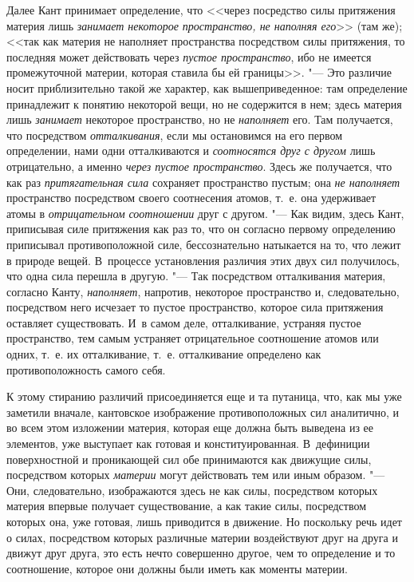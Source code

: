 Далее Кант принимает определение, что <<через посредство силы притяжения
материя лишь {\em занимает некоторое пространство, не
наполняя его}>> (там же); <<так как материя не наполняет пространства
посредством силы притяжения, то последняя может действовать через
{\em пустое пространство}, ибо не имеется промежуточной
материи, которая ставила бы ей границы>>. "--- Это различие носит
приблизительно такой же характер, как вышеприведенное: там определение
принадлежит к понятию некоторой вещи, но не содержится в нем; здесь материя
лишь {\em занимает} некоторое пространство, но не
{\em наполняет} его. Там получается, что посредством
{\em отталкивания}, если мы остановимся на его первом
определении, нами одни отталкиваются и {\em соотносятся
друг с другом} лишь отрицательно, а именно {\em через
пустое пространство}. Здесь же получается, что как раз
{\em притягательная сила} сохраняет пространство
пустым; она {\em не наполняет} пространство посредством
своего соотнесения атомов, т.~е. она удерживает атомы в {\em отрицательном}
{\em соотношении} друг с другом. "--- Как видим, здесь
Кант, приписывая силе притяжения как раз то, что он согласно первому
определению приписывал противоположной силе, бессознательно натыкается на
то, что лежит в природе вещей. В~процессе установления различия этих двух
сил получилось, что одна сила перешла в другую. "--- Так посредством
отталкивания материя, согласно Канту, {\em наполняет},
напротив, некоторое пространство и, следовательно, посредством него
исчезает то пустое пространство, которое сила притяжения оставляет
существовать. И~в самом деле, отталкивание, устраняя пустое пространство,
тем самым устраняет отрицательное соотношение атомов или одних, т.~е. их
отталкивание, т.~е. отталкивание определено как противоположность самого себя.

К этому стиранию различий присоединяется еще и та путаница, что, как мы уже
заметили вначале, кантовское изображение противоположных сил аналитично, и
во всем этом изложении материя, которая еще должна быть выведена из ее
элементов, уже выступает как готовая и конституированная. В~дефиниции
поверхностной и проникающей сил обе принимаются как движущие силы,
посредством которых {\em материи} могут действовать тем
или иным образом. "--- Они, следовательно, изображаются здесь не как силы,
посредством которых материя впервые получает существование, а как такие
силы, посредством которых она, уже готовая, лишь приводится в движение. Но
поскольку речь идет о силах, посредством которых различные материи
воздействуют друг на друга и движут друг друга, это есть нечто совершенно
другое, чем то определение и то соотношение, которое они должны были иметь
как моменты материи.

